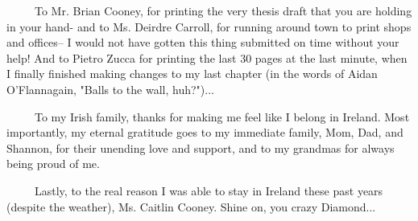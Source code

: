 \begin{acknowledgements}
~~~~~To Mr. Brian Cooney, for printing the very thesis draft that you are holding in your hand- and to Ms. Deirdre Carroll, for running around town to print shops and offices-- I would not have gotten this thing submitted on time without your help! And to Pietro Zucca for printing the last 30 pages at the last minute, when I finally finished making changes to my last chapter (in the words of Aidan O'Flannagain, "Balls to the wall, huh?")...

~~~~~To my Irish family, thanks for making me feel like I belong in Ireland.
Most importantly, my eternal gratitude goes to my immediate family, Mom, Dad, and Shannon, for their unending love and support, and to my grandmas for always being proud of me.

~~~~~Lastly, to the real reason I was able to stay in Ireland these past years (despite the weather), Ms. Caitlin Cooney. Shine on, you crazy Diamond...
\end{acknowledgements}
